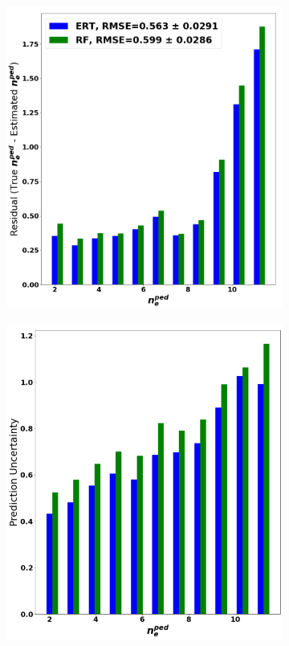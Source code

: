 \documentclass[a4paper, twoside, final, 12pt]{article}
\begin{document}
{\begin{figure}[h!]
		\centering
		\begin{subfigure}{0.48\linewidth}
		\centering
		\includegraphics[scale=0.23]{ ./src/Tree_residual}
				\caption{}
		\label{subfig:RF_RES}
	\end{subfigure}
	\begin{subfigure}{0.48\linewidth}
		\centering
		\includegraphics[scale=0.32]{ ./src/Tree_uncert}

\end{subfigure}
\end{figure}}
\end{document}
